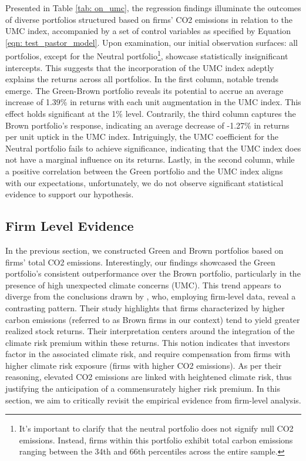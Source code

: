 \documentclass[12pt]{article}
\begin{document}
Presented in Table \ref{tab: on_umc}, the regression findings illuminate the outcomes of diverse portfolios structured based on firms' CO2 emissions in relation to the UMC index, accompanied by a set of control variables as specified by Equation \ref{eqn: test_pastor_model}. Upon examination, our initial observation surfaces: all portfolios, except for the Neutral portfolio\footnote{It's important to clarify that the neutral portfolio does not signify null CO2 emissions. Instead, firms within this portfolio exhibit total carbon emissions ranging between the 34th and 66th percentiles across the entire sample.}, showcase statistically insignificant intercepts. This suggests that the incorporation of the UMC index adeptly explains the returns across all portfolios. In the first column, notable trends emerge. The Green-Brown portfolio reveals its potential to accrue an average increase of 1.39\% in returns with each unit augmentation in the UMC index. This effect holds significant at the 1\% level. Contrarily, the third column captures the Brown portfolio's response, indicating an average decrease of -1.27\% in returns per unit uptick in the UMC index. Intriguingly, the UMC coefficient for the Neutral portfolio fails to achieve significance, indicating that the UMC index does not have a marginal influence on its returns. Lastly, in the second column, while a positive correlation between the Green portfolio and the UMC index aligns with our expectations, unfortunately, we do not observe significant statistical evidence to support our hypothesis.


\subsection{Firm Level Evidence}

In the previous section, we constructed Green and Brown portfolios based on firms' total CO2 emissions. Interestingly, our findings showcased the Green portfolio's consistent outperformance over the Brown portfolio, particularly in the presence of high unexpected climate concerns (UMC). This trend appears to diverge from the conclusions drawn by \cite{bolton2021investors}, who, employing firm-level data, reveal a contrasting pattern. Their study highlights that firms characterized by higher carbon emissions (referred to as Brown firms in our context) tend to yield greater realized stock returns. Their interpretation centers around the integration of the climate risk premium within these returns. This notion indicates that investors factor in the associated climate risk, and require compensation from firms with higher climate risk exposure (firms with higher CO2 emissions). As per their reasoning, elevated CO2 emissions are linked with heightened climate risk, thus justifying the anticipation of a commensurately higher risk premium. In this section, we aim to critically revisit the empirical evidence from firm-level analysis.
\end{document}
